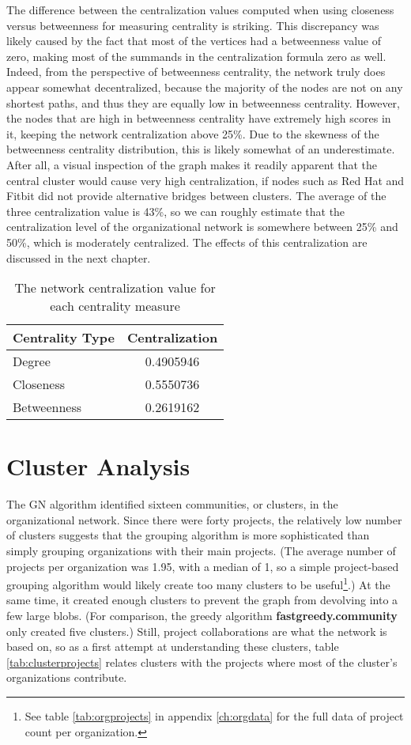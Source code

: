 The difference between the centralization values computed when using closeness versus betweenness for measuring centrality is striking. This discrepancy was likely caused by the fact that most of the vertices had a betweenness value of zero, making most of the summands in the centralization formula zero as well. Indeed, from the perspective of betweenness centrality, the network truly does appear somewhat decentralized, because the majority of the nodes are not on any shortest paths, and thus they are equally low in betweenness centrality. However, the nodes that are high in betweenness centrality have extremely high scores in it, keeping the network centralization above 25\%. Due to the skewness of the betweenness centrality distribution, this is likely somewhat of an underestimate. After all, a visual inspection of the graph makes it readily apparent that the central cluster would cause very high centralization, if nodes such as Red Hat and Fitbit did not provide alternative bridges between clusters. The average of the three centralization value is 43\%, so we can roughly estimate that the centralization level of the organizational network is somewhere between 25\% and 50\%, which is moderately centralized. The effects of this centralization are discussed in the next chapter.

\begin{table}
	\begin{tabular}{l|c}
		\bfseries Centrality Type & \bfseries Centralization \\
		\hline
		Degree & 0.4905946 \\
		\hline
		Closeness & 0.5550736 \\
		\hline
		Betweenness & 0.2619162
	\end{tabular}
	\centering
	\caption{The network centralization value for each centrality measure}\label{tab:centralization}
\end{table}

\section{Cluster Analysis}\label{clustersection}
The GN algorithm identified sixteen communities, or clusters, in the organizational network. Since there were forty projects, the relatively low number of clusters suggests that the grouping algorithm is more sophisticated than simply grouping organizations with their main projects. (The average number of projects per organization was 1.95, with a median of 1, so a simple project-based grouping algorithm would likely create too many clusters to be useful\footnote{See table \ref{tab:orgprojects} in appendix \ref{ch:orgdata} for the full data of project count per organization.}.) At the same time, it created enough clusters to prevent the graph from devolving into a few large blobs. (For comparison, the greedy algorithm \textbf{fastgreedy.community} only created five clusters.)
Still, project collaborations are what the network is based on, so as a first attempt at understanding these clusters, table \ref{tab:clusterprojects} relates clusters with the projects where most of the cluster's organizations contribute.

